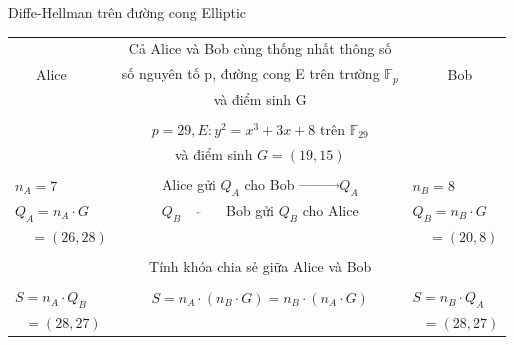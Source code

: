 \documentclass[compress]{beamer}
\begin{document}
\begin{frame}{Diffe-Hellman trên đường cong Elliptic}
\begin{flushleft}
\footnotesize{
\begin{tabular}{lcl}
      &  Cả Alice và Bob cùng thống nhất thông số &   \\
\ \ \ Alice &  số nguyên tố p, đường cong E trên trường $\mathbb{F}_p$ & \ \ \ \ \ Bob \\
      &  và điểm sinh G                                          &  \\
\hline \\
      &   $p = 29, E: y^2 = x^3 + 3x + 8$ trên $\mathbb{F}_{29}$ &  \\
      &  và điểm sinh $G = (19, 15)$ & \\
\hline \\ 
$n_A = 7$ &  Alice gửi $Q_A$ cho Bob $\overrightarrow{ \ \ \ \ \ \ \ \ \ \  \ \ \ } Q_A$    &$n_B = 8$  \\
$Q_A = n_A\cdot G$ & $Q_B \overleftarrow{ \ \ \ \ \ \ \ \ \ \  \ \ \ }$ Bob gửi $Q_B$ cho Alice                        &$Q_B = n_B\cdot G$ \\
$\ \ \ \ \ = (26, 28) $ &                           &$\ \ \ \ \ = (20, 8)$ \\
\hline \\
      & Tính khóa chia sẻ giữa Alice và Bob & \\
\hline \\
$S = n_A\cdot Q_B$ &  $S = n_A\cdot (n_B\cdot G) = n_B\cdot (n_A\cdot G)$ & $S = n_B\cdot Q_A$ \\
$\ \ \ = (28, 27)$ &                    &$\ \ \ = (28, 27)$
\end{tabular}
}
\end{flushleft}
\end{frame}
\end{document}
